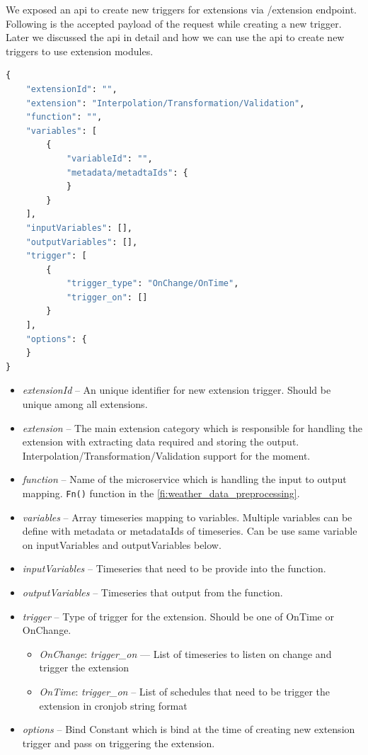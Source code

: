 We exposed an \acrshort{api} to create new triggers for extensions via /extension endpoint. Following is the accepted payload of the request while creating a new trigger. Later we discussed the \acrshort{api} in detail and how we can use the \acrshort{api} to create new triggers to use extension modules.

\begin{lstlisting}[language=Python]
{
    "extensionId": "",
    "extension": "Interpolation/Transformation/Validation",
    "function": "",
    "variables": [
        {
            "variableId": "",
            "metadata/metadtaIds": {
            }
        }
    ],
    "inputVariables": [],
    "outputVariables": [],
    "trigger": [
        {
            "trigger_type": "OnChange/OnTime",
            "trigger_on": []
        }
    ],
    "options": {
    }
}
\end{lstlisting}
\begin{itemize}
    \item \emph{extensionId} -- An unique identifier for new extension trigger. Should be unique among all extensions.
    \item \emph{extension} -- The main extension category which is responsible for handling the extension with extracting data required and storing the output. Interpolation/Transformation/Validation support for the moment.
    \item \emph{function} -- Name of the microservice which is handling the input to output mapping. \texttt{Fn()} function in the \cref{fi:weather_data_preprocessing}.
    \item \emph{variables} -- Array timeseries mapping to variables. Multiple variables can be define with metadata or metadataIds of timeseries. Can be use same variable on inputVariables and outputVariables below.
    \item \emph{inputVariables} -- Timeseries that need to be provide into the function.
    \item \emph{outputVariables} -- Timeseries that output from the function.
    \item \emph{trigger} -- Type of trigger for the extension. Should be one of OnTime or OnChange.
        \begin{itemize}
            \item \emph{OnChange}: \textit{trigger\_on} --- List of timeseries to listen on change and trigger the extension
            \item \emph{OnTime}: \textit{trigger\_on} -- List of schedules that need to be trigger the extension in cronjob string format
        \end{itemize}
    \item \emph{options} -- Bind Constant which is bind at the time of creating new extension trigger and pass on triggering the extension.
\end{itemize}


